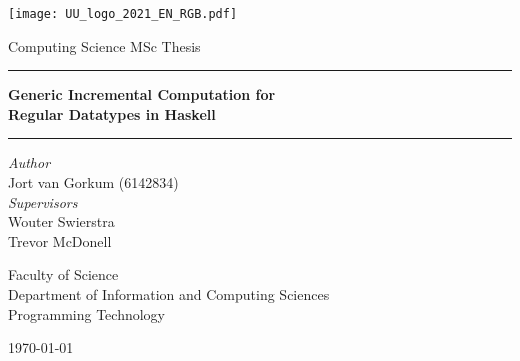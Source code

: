 \begin{titlepage}
  \fontsize{12pt}{15pt}\selectfont
  \begin{center}
    \vspace*{\fill}
    \texttt{[image: UU\_logo\_2021\_EN\_RGB.pdf]}

    \vspace{1.75cm}

    Computing Science MSc Thesis

    \vspace{0.55cm}

    \hrule
    \vspace{0.4cm}
    {
      \fontsize{20.74pt}{20.74pt}\selectfont
      \parbox[]{13cm} {
        \centering
        \textbf{Generic Incremental Computation for \\ Regular Datatypes in Haskell}
      }
    }
    \vspace{0.5cm}
    \hrule
      
    \vspace{2.0cm}
    
    \begin{multicols}{2}
      \textit{Author} \\
      Jort van Gorkum (6142834) \\
    \columnbreak
      \textit{Supervisors} \\
      Wouter Swierstra \\
      Trevor McDonell \\
    \end{multicols}

    
    \vspace{2.0cm}

    \begin{small}
      Faculty of Science \\
      Department of Information and Computing Sciences \\
      Programming Technology \\
    \end{small}
    
    \vspace{1.5cm}

    \monthyeardate\today
  \end{center}
\end{titlepage}